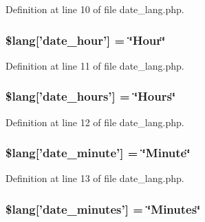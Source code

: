 Definition at line 10 of file date\-\_\-lang.\-php.

\hypertarget{date__lang_8php_a7a4e78ef1f19291c5a7818cf08bfa3ca}{
\subsubsection[{\$lang}]{\setlength{\rightskip}{0pt plus 5cm}\$lang\mbox{[}'date\-\_\-hour'\mbox{]} = \char`\"{}Hour\char`\"{}}}\label{date__lang_8php_a7a4e78ef1f19291c5a7818cf08bfa3ca}


Definition at line 11 of file date\-\_\-lang.\-php.

\hypertarget{date__lang_8php_ad1fe07226d651882b9ecce9cb2011db2}{
\subsubsection[{\$lang}]{\setlength{\rightskip}{0pt plus 5cm}\$lang\mbox{[}'date\-\_\-hours'\mbox{]} = \char`\"{}Hours\char`\"{}}}\label{date__lang_8php_ad1fe07226d651882b9ecce9cb2011db2}


Definition at line 12 of file date\-\_\-lang.\-php.

\hypertarget{date__lang_8php_a999a95f4f9c529af571d30f9615c93f3}{
\subsubsection[{\$lang}]{\setlength{\rightskip}{0pt plus 5cm}\$lang\mbox{[}'date\-\_\-minute'\mbox{]} = \char`\"{}Minute\char`\"{}}}\label{date__lang_8php_a999a95f4f9c529af571d30f9615c93f3}


Definition at line 13 of file date\-\_\-lang.\-php.

\hypertarget{date__lang_8php_ab41862e6c3ef784a6e32992cfb9a6e1c}{
\subsubsection[{\$lang}]{\setlength{\rightskip}{0pt plus 5cm}\$lang\mbox{[}'date\-\_\-minutes'\mbox{]} = \char`\"{}Minutes\char`\"{}}}\label{date__lang_8php_ab41862e6c3ef784a6e32992cfb9a6e1c}


